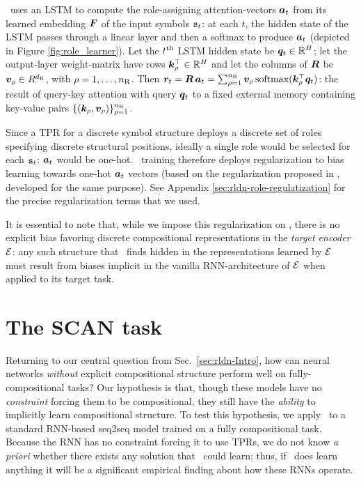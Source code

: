 \RLN\ uses an LSTM \citep{Hochreiter:1997:LSM:1246443.1246450} to compute the role-assigning attention-vectors ${\bm{a}}_t$ from its learned embedding ${\bm{F}}$ of the input symbols ${\mathtt{s}}_t$: at each $t$, the hidden state of the LSTM passes through a linear layer and then a softmax to produce ${\bm{a}}_t$ (depicted in Figure \ref{fig:role_learner}). Let the $t^{{\mathrm{th}}}$ LSTM hidden state be ${\bm{q}}_t \in \mathbb{R}^H$; let the output-layer weight-matrix have rows ${\bm{k}}_\rho^\top \in \mathbb{R}^H$ and let the columns of ${\bm{R}}$ be ${\bm{v}}_\rho \in R^{d_{\mathrm{R}}}$, with $\rho = 1,\dots,n_{\mathrm{R}}$. Then ${\bm{r}}_t = {\bm{R}}\, {\bm{a}}_t = \sum_{\rho=1}^{n_{\mathrm{R}}} {\bm{v}}_\rho\, \mathrm{softmax} ( {\bm{k}}_\rho^\top {\bm{q}}_t )$: the result of query-key attention  \citep[e.g.,][]{vaswani2017attention} with query ${\bm{q}}_t$ to a fixed external memory containing key-value pairs $\{ ( {\bm{k}}_\rho, {\bm{v}}_\rho ) \}_{\rho=1}^{n_{\mathrm{R}}}$.

Since a TPR for a discrete symbol structure deploys a discrete set of roles specifying discrete structural positions, ideally a single role would be selected for each ${\mathtt{s}}_t$: ${\bm{a}}_t$ would be one-hot.
\RLN\ training therefore deploys regularization to bias learning towards one-hot ${\bm{a}}_t$ vectors (based on the regularization proposed in \citet{palangi}, developed for the same purpose). See Appendix \ref{sec:rldn-role-regulatization} for the precise regularization terms that we used.

It is essential to note that, while we impose this regularization on \RLN, there is no explicit bias favoring discrete compositional representations in the \textit{target encoder} ${\mathcal{E}}$: any such structure that \RLN\ finds hidden in the representations learned by ${\mathcal{E}}$ must result from biases implicit in the vanilla RNN-architecture of ${\mathcal{E}}$ when applied to its target task.

\section{The SCAN task} \label{sec:rldn-SCAN}

Returning to our central question from Sec.~\ref{sec:rldn-Intro}, how can neural networks \textit{without} explicit compositional structure perform well on fully-compositional tasks? 
Our hypothesis is that, though these models have no \textit{constraint} forcing them to be compositional, they still have the \textit{ability} to implicitly learn compositional structure.
To test this hypothesis, we apply \RLN\ to a standard RNN-based seq2seq model \citep{sutskever2014sequence} trained on a fully compositional task. Because the RNN has no constraint forcing it to use TPRs, we do not know \textit{a priori} whether there exists any solution that \RLN\ could learn; thus, if \RLN\ does learn anything it will be a significant empirical finding about how these RNNs operate.

